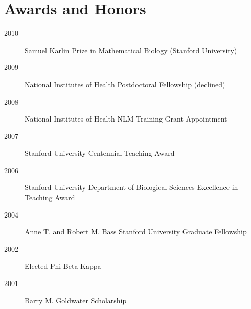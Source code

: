 \documentclass[11pt]{article}
\begin{document}
  \section{Awards and Honors}

  \begin{description}
  \item[2010] Samuel Karlin Prize in Mathematical Biology (Stanford University) 
  \item[2009] National Institutes of Health Postdoctoral Fellowship (declined)
  \item[2008] National Institutes of Health NLM Training Grant Appointment
  \item[2007] Stanford University Centennial Teaching Award
  \item[2006] Stanford University Department of Biological Sciences Excellence in Teaching Award
  \item[2004] Anne T. and Robert M. Bass Stanford University Graduate Fellowship
  \item[2002] Elected Phi Beta Kappa
  \item[2001] Barry M. Goldwater Scholarship
  \end{description}
  
\end{document}
